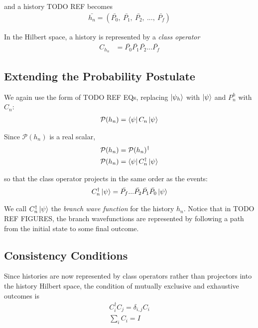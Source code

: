 and a history TODO REF becomes
\begin{align}
  \bar{h_n} = \left(\bar{P_0}, \: \bar{P_1}, \: \bar{P_2}, \:..., \: \bar{P_f} \right)
\end{align}

In the Hilbert space, a history is represented by a \textit{class operator}
\begin{align}
  C_{h_n} &= \bar{P_0} \bar{P_1} \bar{P_2} ... \bar{P_f}
\end{align}

\subsection{Extending the Probability Postulate}

We again use the form of TODO REF EQs, replacing $\ket{\psi_h}$ with $\ket{\psi}$ and $P^h_n$ with $C_n$:
\begin{align}
  \mathcal{P}(h_n) = \bra{\psi} C_n \ket{\psi}
\end{align}

Since $\mathcal{P}(h_n)$ is a real scalar,
\begin{align}
  \mathcal{P}(h_n) &= \mathcal{P}(h_n)^\dagger \\ \nonumber
  \mathcal{P}(h_n) &= \bra{\psi} C_n^\dagger \ket{\psi}
\end{align}

so that the class operator projects in the same order as the events:
\begin{align}
  C_n^\dagger \ket{\psi} = \bar{P_f}...\bar{P_2}\bar{P_1}\bar{P_0}\ket{\psi}
\end{align}

We call $C_n^\dagger \ket{\psi}$ the \textit{branch wave function} for the history $h_n$. Notice that in TODO REF FIGURES, the branch wavefunctions are represented by following a path from the initial state to some final outcome.

\subsection{Consistency Conditions}

Since histories are now represented by class operators rather than projectors into the history Hilbert space, the condition of mutually exclusive and exhaustive outcomes is
\begin{align}
  C_i^\dagger C_j = \delta_{i,j} C_i \\
  \sum_i C_i = I
\end{align}

